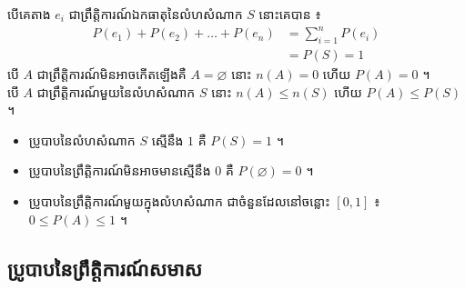 \begin{formulaBox}[ជាទូទៅ]
បើគេតាង $e_i$ ជាព្រឹត្តិការណ៍ឯកធាតុនៃលំហសំណាក $S$ នោះគេបាន ៖
\[
\begin{aligned}
P(e_1) + P(e_2) + \dots + P(e_n) &= \sum_{i = 1}^{n} P(e_i)\\
&= P(S) = 1
\end{aligned}
\]
បើ $A$ ជាព្រឹត្តិការណ៍មិនអាចកើតឡើងគឺ $A = \varnothing$ នោះ $n(A) = 0$ ហើយ $P(A) = 0$ ។\\
បើ $A$ ជាព្រឹត្តិការណ៍មួយនៃលំហសំណាក $S$ នោះ $n(A) \le n(S)$ ហើយ $P(A) \le P(S)$ ។
\end{formulaBox}

\begin{theorem}[សន្និដ្ឋាន]
\begin{itemize}
  \item ប្រូបាបនៃលំហសំណាក $S$ ស្មើនឹង $1$ គឺ $P(S) = 1$ ។
  \item ប្រូបាបនៃព្រឹត្តិការណ៍មិនអាចមានស្មើនឹង $0$ គឺ $P(\varnothing) = 0$ ។
  \item ប្រូបាបនៃព្រឹត្តិការណ៍មួយក្នុងលំហសំណាក ជាចំនួនដែលនៅចន្លោះ $[0, 1]$ ៖ $0 \le P(A) \le 1$ ។
\end{itemize}
\end{theorem}

\subsection{ប្រូបាបនៃព្រឹត្តិការណ៍សមាស}

